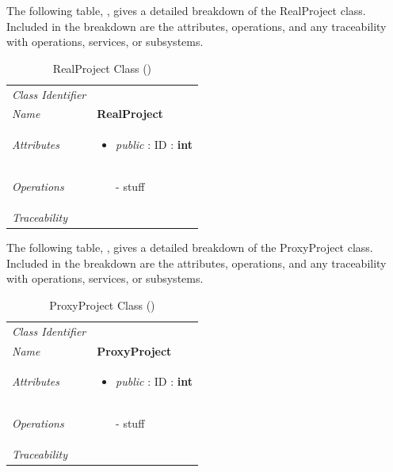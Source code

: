\documentclass[12pt,letterpaper]{article}
\begin{document}
The following table, , gives a detailed breakdown of the RealProject class. Included in the breakdown are the attributes, operations, and any traceability with operations, services, or subsystems.

\begin{table}[H]
    \caption{RealProject Class ()} 
	\begin{tabu} to 
		\toprule
		Class Identifier &  \\
		Name & {\bf RealProject} \\
		Attributes & 
		\begin{minipage}[t]{\linewidth}
		    \begin{itemize}
		        \item \textit{public} : ID : \bf{int}
			\end{itemize}
	    \end{minipage} \\

		Operations &
		\begin{minipage}[t]{\linewidth}
			\begin{enumerate}
			    \item[-] stuff
	        \end{enumerate}
	    \end{minipage} \\
	    	Traceability & \\
		\toprule
	\end{tabu}
\end{table}

The following table, , gives a detailed breakdown of the ProxyProject class. Included in the breakdown are the attributes, operations, and any traceability with operations, services, or subsystems.

\begin{table}[H]
    \caption{ProxyProject Class ()} 
	\begin{tabu} to 
		\toprule
		Class Identifier &  \\
		Name & {\bf ProxyProject} \\
		Attributes & 
		\begin{minipage}[t]{\linewidth}
		    \begin{itemize}
		        \item \textit{public} : ID : \bf{int}
			\end{itemize}
	    \end{minipage} \\

		Operations &
		\begin{minipage}[t]{\linewidth}
			\begin{enumerate}
			    \item[-] stuff
	        \end{enumerate}
	    \end{minipage} \\
	    	Traceability & \\
		\toprule
	\end{tabu}
\end{table}
\end{document}
